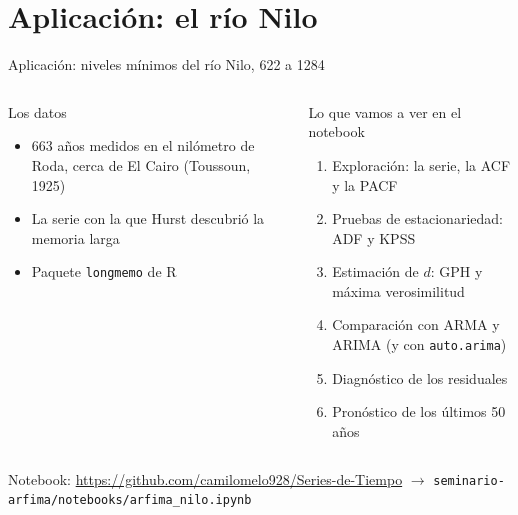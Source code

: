 \documentclass[aspectratio=169,11pt]{beamer}
\begin{document}
\section{Aplicación: el río Nilo}
\begin{frame}{Aplicación: niveles mínimos del río Nilo, 622 a 1284}
\begin{columns}[T]
\begin{block}{Los datos}
\begin{itemize}
\item 663 años medidos en el nilómetro de Roda, cerca de El Cairo (Toussoun, 1925)
\item La serie con la que Hurst descubrió la memoria larga
\item Paquete \texttt{longmemo} de R
\end{itemize}
\end{block}
\begin{block}{Lo que vamos a ver en el notebook}
\begin{enumerate}
\item Exploración: la serie, la ACF y la PACF
\item Pruebas de estacionariedad: ADF y KPSS
\item Estimación de $d$: GPH y máxima verosimilitud
\item Comparación con ARMA y ARIMA (y con \texttt{auto.arima})
\item Diagnóstico de los residuales
\item Pronóstico de los últimos 50 años
\end{enumerate}
\end{block}
\end{columns}
\vspace{0.4cm}
\centering
\footnotesize Notebook: \url{https://github.com/camilomelo928/Series-de-Tiempo} \;$\rightarrow$\; \texttt{seminario-arfima/notebooks/arfima\_nilo.ipynb}
\end{frame}
\end{document}
